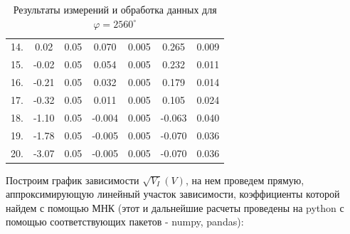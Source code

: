 \documentclass[a4paper,12pt]{extarticle}
\begin{document}
\begin{table}[H]
\begin{center}
\begin{tabular}{|c|c|c|c|c|c|c|}
            14. & 0.02  & 0.05  & 0.070 & 0.005 & 0.265 & 0.009 \\
            15. & -0.02 & 0.05  & 0.054 & 0.005 & 0.232 & 0.011 \\
            16. & -0.21 & 0.05  & 0.032 & 0.005 & 0.179 & 0.014 \\
            17. & -0.32 & 0.05  & 0.011 & 0.005 & 0.105 & 0.024 \\
            18. & -1.10 & 0.05  & -0.004 & 0.005 & -0.063 & 0.040 \\
            19. & -1.78 & 0.05  & -0.005 & 0.005 & -0.070 & 0.036 \\
            20. & -3.07 & 0.05  & -0.005 & 0.005 & -0.070 & 0.036 \\
            \hline 
        \end{tabular} 
        \caption{Результаты измерений и обработка данных для $ \varphi = 2560^\circ $}
    \end{center}
\end{table}
Построим график зависимости $\sqrt{V_I}(V)$, на нем проведем прямую, аппроксимирующую линейный участок зависимости, коэффициенты которой найдем с помощью МНК (этот и дальнейшие расчеты проведены на python с помощью соответствующих пакетов - numpy, pandas):

\begin{minipage}{1\textwidth}
    \end{minipage}
\end{document}
